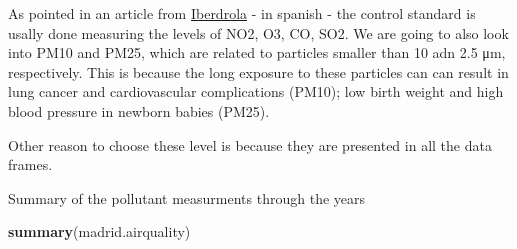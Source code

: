\documentclass[
]{article}
\newenvironment{Shaded}{\begin{snugshade}}{\end{snugshade}}
\newcommand{\KeywordTok}[1]{\textcolor[rgb]{0.13,0.29,0.53}{\textbf{#1}}}
\newcommand{\NormalTok}[1]{#1}
\begin{document}
As pointed in an article from
\href{https://www.iberdrola.com/medio-ambiente/contaminacion-calidad-aire}{Iberdrola}
- in spanish - the control standard is usally done measuring the levels
of NO2, O3, CO, SO2. We are going to also look into PM10 and PM25, which
are related to particles smaller than 10 adn 2.5 μm, respectively. This
is because the long exposure to these particles can can result in lung
cancer and cardiovascular complications (PM10); low birth weight and
high blood pressure in newborn babies (PM25).

Other reason to choose these level is because they are presented in all
the data frames.

Summary of the pollutant measurments through the years

\begin{Shaded}
\begin{Highlighting}[]
\KeywordTok{summary}\NormalTok{(madrid.airquality) }
\end{Highlighting}
\end{Shaded}
\end{document}
